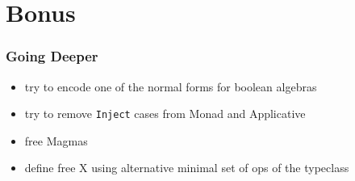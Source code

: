 \documentclass{beamer}
\begin{document}
\begin{frame}
  \tableofcontents{}
\end{frame}

\appendix{}

\section*{Bonus}\label{sec:bonus}

\begin{frame}
  \frametitle{Going Deeper}
  \begin{itemize}
  \item try to encode one of the normal forms for boolean algebras
  \item try to remove \texttt{Inject} cases from Monad and Applicative
  \item free Magmas
  \item define free X using alternative minimal set of ops of the typeclass
  \end{itemize}
\end{frame}
\end{document}
